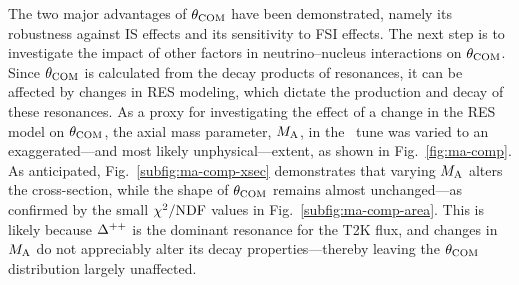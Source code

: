      The two major advantages of $\theta_{\textrm{COM}}$ have been demonstrated, namely its robustness against IS effects and its sensitivity to FSI effects.
     The next step is to investigate the impact of other factors in neutrino–nucleus interactions on $\theta_{\textrm{COM}}$.
     Since $\theta_{\textrm{COM}}$ is calculated from the decay products of resonances, it can be affected by changes in RES modeling, which dictate the production and decay of these resonances.
     As a proxy for investigating the effect of a change in the RES model on $\theta_{\textrm{COM}}$, the axial mass parameter, $M_{\textrm{A}}$, in the \gZero\ tune was varied to an exaggerated—and most likely unphysical—extent, as shown in Fig.~\ref{fig:ma-comp}.
     As anticipated, Fig.~\ref{subfig:ma-comp-xsec} demonstrates that varying $M_{\textrm{A}}$ alters the cross-section, while the shape of $\theta_{\textrm{COM}}$ remains almost unchanged—as confirmed by the small $\chi^2/{\textrm{NDF}}$ values in Fig.~\ref{subfig:ma-comp-area}.
     This is likely because $\Delta^{++}$ is the dominant resonance for the T2K flux, and changes in $M_{\textrm{A}}$ do not appreciably alter its decay properties—thereby leaving the $\theta_{\textrm{COM}}$ distribution largely unaffected.
